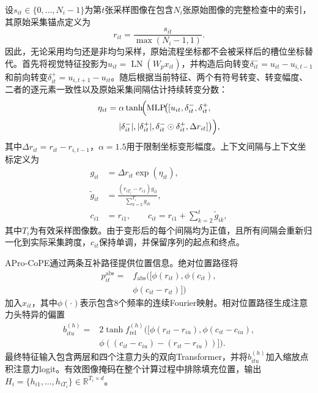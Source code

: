 \documentclass[Afour,sagev,times]{sagej}
\begin{document}
设$s_{it}\in\{0,\ldots,N_i-1\}$为第$t$张采样图像在包含$N_i$张原始图像的完整检查中的索引，其原始采集锚点定义为
\begin{equation}
r_{it}=\frac{s_{it}}{\max(N_i-1,1)}.
\end{equation}
因此，无论采用均匀还是非均匀采样，原始流程坐标都不会被采样后的槽位坐标替代。首先将视觉特征投影为$u_{it}=\operatorname{LN}(W_px_{it})$，并构造后向转变$\delta^-_{it}=u_{it}-u_{i,t-1}$和前向转变$\delta^+_{it}=u_{i,t+1}-u_{it}$。随后根据当前特征、两个有符号转变、转变幅度、二者的逐元素一致性以及原始采集间隔估计持续转变分数：
\begin{equation}
\begin{aligned}
\eta_{it}={}&\alpha\tanh\!\Bigl(\operatorname{MLP}\!\bigl(
[u_{it},\delta^-_{it},\delta^+_{it},\\
&|\delta^-_{it}|,|\delta^+_{it}|,
\delta^-_{it}\odot\delta^+_{it},\Delta r_{it}]\bigr)\Bigr),
\end{aligned}
\end{equation}
其中$\Delta r_{it}=r_{it}-r_{i,t-1}$，$\alpha=1.5$用于限制坐标变形幅度。上下文间隔与上下文坐标定义为
\begin{align}
g_{it}&=\Delta r_{it}\exp(\eta_{it}),\\
\widetilde g_{it}&=\frac{(r_{iT_i}-r_{i1})g_{it}}{\sum_{k=2}^{T_i}g_{ik}},\\
c_{i1}&=r_{i1},\qquad c_{it}=r_{i1}+\sum_{k=2}^{t}\widetilde g_{ik},
\end{align}
其中$T_i$为有效采样图像数。由于变形后的每个间隔均为正值，且所有间隔会重新归一化到实际采集跨度，$c_{it}$保持单调，并保留序列的起点和终点。

APro-CoPE通过两条互补路径提供位置信息。绝对位置路径将
\begin{equation}
\begin{aligned}
p^{\mathrm{abs}}_{it}={}&f_{\mathrm{abs}}([\phi(r_{it}),\phi(c_{it}),\\
&\phi(c_{it}-r_{it})])
\end{aligned}
\end{equation}
加入$x_{it}$，其中$\phi(\cdot)$表示包含8个频率的连续Fourier映射。相对位置路径生成注意力头特异的偏置
\begin{equation}
\begin{aligned}
b^{(h)}_{itu}={}&2\tanh f^{(h)}_{\mathrm{rel}}\bigl([\phi(r_{it}-r_{iu}),
\phi(c_{it}-c_{iu}),\\
&\phi((c_{it}-c_{iu})-(r_{it}-r_{iu}))]\bigr).
\end{aligned}
\end{equation}
最终特征输入包含两层和四个注意力头的双向Transformer，并将$b^{(h)}_{itu}$加入缩放点积注意力logit。有效图像掩码在整个计算过程中排除填充位置，输出$H_i=\{h_{i1},\ldots,h_{iT_i}\}\in\mathbb{R}^{T_i\times d}$。
\end{document}
